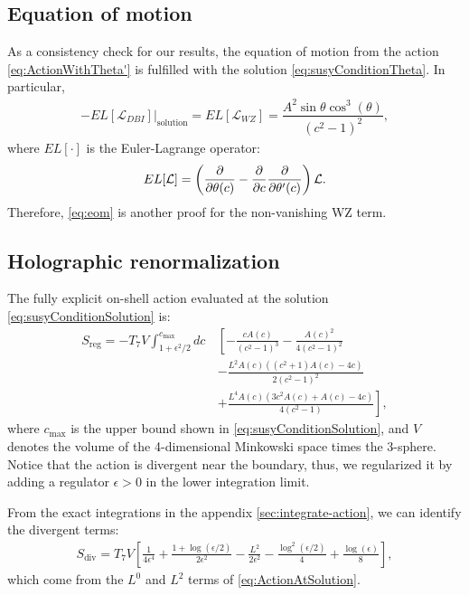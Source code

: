 
\subsection{Equation of motion}

As a consistency check for our results, the equation of motion from the action \eqref{eq:ActionWithTheta'} is fulfilled with the solution \eqref{eq:susyConditionTheta}. In particular, 
\begin{align}\label{eq:eom}
-\left.EL[\mathcal{L}_{DBI}]\right|_\text{solution} = EL[\mathcal{L}_{WZ}] = \dfrac{A^2 \sin\theta \cos^3(\theta)}{\left(c^2-1\right)^2},
\end{align}
where $EL[\cdot]$ is the Euler-Lagrange operator:
\begin{equation}
 EL[\mathcal{L}] = 
 \left(\dfrac{\partial }{\partial \theta(c)} -\dfrac{\partial }{\partial c}  \dfrac{\partial }{\partial \theta'(c)} \right) \mathcal{L}.
\end{equation}
Therefore, \eqref{eq:eom} is another proof for the non-vanishing WZ term.



\subsection{Holographic renormalization}
The fully explicit on-shell action evaluated at the solution \eqref{eq:susyConditionSolution} is:
\begin{align}\label{eq:ActionAtSolution}
 S_\text{reg} = -T_7 V \int_{1 + \epsilon^2/2}^{c_\text{max}} d c \, 
 &\left[-\frac{c A(c)}{\left(c^2-1\right)^3} -\frac{A(c)^2}{4 \left(c^2-1\right)^2} \right. \nonumber\\
 &-\frac{L^2 A(c) \left(\left(c^2+1\right) A(c)-4 c\right)}{2 \left(c^2-1\right)^2} \nonumber\\
 &+\left.\frac{L^4 A(c) \left(3 c^2 A(c)+A(c)-4 c\right)}{4 \left(c^2-1\right)}\right],
\end{align}
where $c_\text{max}$ is the upper bound shown in \eqref{eq:susyConditionSolution}, and $V$ denotes the volume of the 4-dimensional Minkowski space times the 3-sphere. Notice that the action is divergent near the boundary, thus, we regularized it by adding a regulator $\epsilon>0$ in the lower integration limit. 

From the exact integrations in the appendix \ref{sec:integrate-action}, we can identify the divergent terms:
\begin{align} \label{eq:Sdiv}
 S_\text{div} = T_7 V 
        \left[ \frac{1}{4 \epsilon ^4} +\frac{1+\log \left(\epsilon/2\right)}{2 \epsilon ^2}-\frac{L^2}{2 \epsilon ^2}-\frac{ \log ^2\left(\epsilon/2\right)}{4}+\frac{\log (\epsilon )}{8} \right],
\end{align}
which come from the $L^0$ and $L^2$ terms of \eqref{eq:ActionAtSolution}. 

